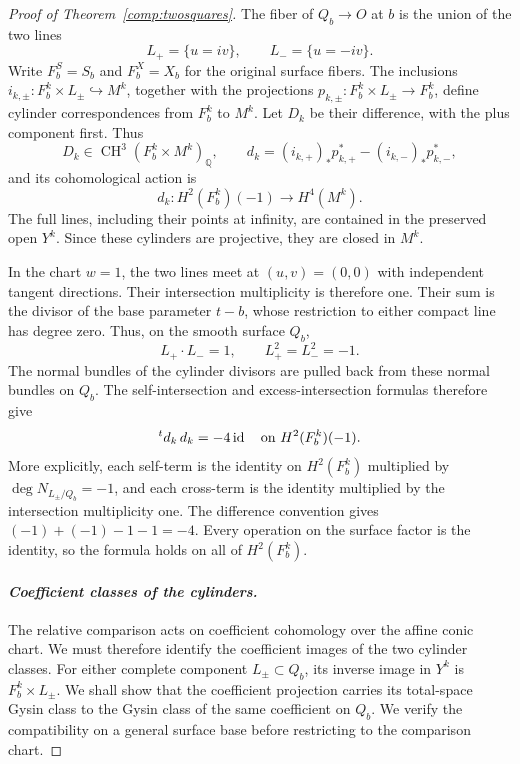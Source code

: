 \documentclass[11pt]{amsart}
\newcommand{\Q}{\mathbb Q}
\DeclareMathOperator{\CH}{CH}
\DeclareMathOperator{\id}{id}
\theoremstyle{definition}
\theoremstyle{remark}
\numberwithin{equation}{section}
\begin{document}
\begin{proof}[Proof of Theorem~\ref{comp:twosquares}]
The fiber of $Q_b\to O$ at $b$ is the union of the two lines
\[
 L_+=\{u=iv\},\qquad L_-=\{u=-iv\}.
\]
Write $F_b^S=S_b$ and $F_b^X=X_b$ for the original surface fibers.
The inclusions $i_{k,\pm}:F_b^k\times L_\pm\hookrightarrow M^k$,
together with the projections $p_{k,\pm}:F_b^k\times L_\pm\to F_b^k$,
define cylinder correspondences from $F_b^k$ to $M^k$.
Let $D_k$ be their difference, with the plus component first.  Thus
\[
 D_k\in\CH^3(F_b^k\times M^k)_\Q,\qquad
 d_k=(i_{k,+})_*p_{k,+}^*-(i_{k,-})_*p_{k,-}^*,
\]
and its cohomological action is
\[
 d_k:H^2(F_b^k)(-1)\longrightarrow H^4(M^k).
\]
The full lines, including their points at infinity, are contained in the
preserved open $Y^k$.  Since these cylinders are projective, they are
closed in $M^k$.

In the chart $w=1$, the two lines meet at $(u,v)=(0,0)$ with independent
tangent directions.  Their intersection multiplicity is therefore one.
Their sum is the divisor of the base parameter $t-b$, whose restriction
to either compact line has degree zero.  Thus, on the smooth surface
$Q_b$,
\[
 L_+\cdot L_-=1,\qquad L_+^2=L_-^2=-1.
\]
The normal bundles of the cylinder divisors are pulled back from these
normal bundles on $Q_b$.  The self-intersection and excess-intersection
formulas \cite[Theorem~6.3, Corollary~6.3, and Theorem~19.2]{Fulton}
therefore give
\begin{equation}\label{comp:minusfour}
 {}^td_k\,d_k=-4\id
 \quad\hbox{on }H^2(F_b^k)(-1).
\end{equation}
More explicitly, each self-term is the identity on $H^2(F_b^k)$ multiplied
by $\deg N_{L_\pm/Q_b}=-1$, and each cross-term is the identity multiplied
by the intersection multiplicity one.  The difference convention gives
$(-1)+(-1)-1-1=-4$.  Every operation on the surface factor is the
identity, so the formula holds on all of $H^2(F_b^k)$.

\paragraph{\emph{Coefficient classes of the cylinders.}}
The relative comparison acts on coefficient cohomology over the affine
conic chart.  We must therefore identify the coefficient images of the
two cylinder classes.  For either complete component $L_\pm\subset Q_b$,
its inverse image in $Y^k$ is $F_b^k\times L_\pm$.  We shall show that
the coefficient projection carries its total-space Gysin class to the
Gysin class of the same coefficient on $Q_b$.  We verify the compatibility
on a general surface base before restricting to the comparison chart.


\end{proof}
\end{document}
